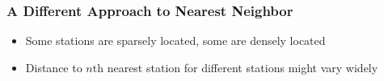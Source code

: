 \begin{frame}
\frametitle{A Different Approach to Nearest Neighbor}
\begin{itemize}
\setlength\itemsep{1em}
\item Some stations are sparsely located, some are densely located
\item Distance to $n$th nearest station for different stations might vary widely
\end{itemize}
\end{frame}
